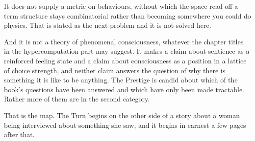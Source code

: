 It does not supply a metric on behaviours, without which the space
read off a term structure stays combinatorial rather than
becoming somewhere you could do physics.
That is stated as the next problem and it is not solved here.

And it is not a theory of phenomenal consciousness, whatever the
chapter titles in the hypercomputation part may suggest.
It makes a claim about sentience as a reinforced feeling state and
a claim about consciousness as a position in a lattice of choice
strength, and neither claim answers the question of why there is
something it is like to be anything.
The Prestige is candid about which of the book's questions have
been answered and which have only been made tractable.
Rather more of them are in the second category.

\bigskip
\noindent
That is the map.
The Turn begins on the other side of a story about a woman being
interviewed about something she saw, and it begins in earnest a few
pages after that.

\renewcommand{\thefigure}{\thechapter.\arabic{figure}}\setcounter{figure}{0}
